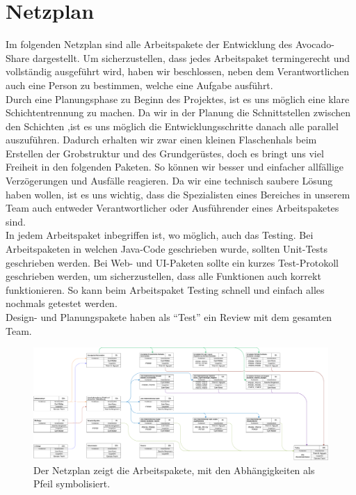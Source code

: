 \section{Netzplan}
Im folgenden Netzplan sind alle Arbeitspakete der Entwicklung des Avocado-Share dargestellt. 
Um sicherzustellen, dass jedes Arbeitspaket termingerecht und vollständig ausgeführt wird, haben wir beschlossen, neben dem Verantwortlichen auch eine Person zu bestimmen, welche eine Aufgabe ausführt.\\

Durch eine Planungsphase zu Beginn des Projektes, ist es uns möglich eine klare Schichtentrennung zu machen.
Da wir in der Planung die Schnittstellen zwischen den Schichten ,ist es uns möglich die Entwicklungsschritte danach
alle parallel auszuführen. Dadurch erhalten wir zwar einen kleinen Flaschenhals beim Erstellen der Grobstruktur und des
Grundgerüstes, doch es bringt uns viel Freiheit in den folgenden Paketen. So können wir besser und einfacher allfällige
Verzögerungen und Ausfälle reagieren.
Da wir eine technisch saubere Lösung haben wollen, ist es uns wichtig, dass die Spezialisten eines Bereiches in unserem Team auch entweder Verantwortlicher oder Ausführender eines Arbeitspaketes sind. \\

In jedem Arbeitspaket inbegriffen ist, wo möglich, auch das Testing.
Bei Arbeitspaketen in welchen Java-Code geschrieben wurde, sollten Unit-Tests geschrieben werden.
Bei Web- und UI-Paketen sollte ein kurzes Test-Protokoll geschrieben werden, um sicherzustellen, dass alle Funktionen auch korrekt funktionieren.
So kann beim Arbeitspaket Testing schnell und einfach alles nochmals getestet werden.\\

Design- und Planungspakete haben als "`Test"' ein Review mit dem gesamten Team.

\begin{landscape}
\vspace*{\fill}
\begin{figure}[H]
\includegraphics[width=\linewidth]{graphics/netzplan_s2.pdf}
\caption{Der Netzplan zeigt die Arbeitspakete, mit den Abhängigkeiten als Pfeil symbolisiert.}
\end{figure}
\vspace*{\fill}
\end{landscape}